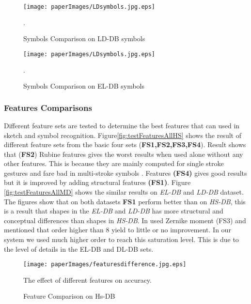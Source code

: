 \begin{figure}
	\centering
		\texttt{[image: paperImages/LDsymbols.jpg.eps]}
	\caption{Symbols Comparison on LD-DB symbols}.  %
	\label{fig:LDtest2}
\end{figure}  


\begin{figure}
	\centering
		\texttt{[image: paperImages/LDsymbols.jpg.eps]}
	\caption{Symbols Comparison on EL-DB symbols}.  %
	\label{fig:ELtest2}
\end{figure}  
 
 
\subsubsection{Features Comparisons}
\label{sec:featuresComparisions}
Different feature sets are tested to determine the best features that can used in sketch and symbol recognition. Figure\ref{fig:testFeaturesAllHS} shows the result of different feature sets from the basic four sets (\textbf{FS1,FS2,FS3,FS4}). Result shows that (\textbf{FS2}) Rubine features \cite{gestureexample12} gives the worst results when used alone without any other features. This is because they are mainly computed for single stroke gestures and fare bad in multi-stroke symbols \cite{compareFeaturSVM}. Features \textbf{(FS4)} gives good results but it is improved by adding structural features \textbf{(FS1)}.  Figure \ref{fig:testFeaturesAllMD} shows the similar results on \textsl{EL-DB} and \textsl{LD-DB} dataset. The figures show that on both datasets \textbf{FS1} perform better than on \textsl{HS-DB}, this is a result that shapes in the \textsl{EL-DB} and \textsl{LD-DB} has more structural and conceptual differences than shapes in \textsl{HS-DB}. In \cite{HeloiseBeautification} used Zernike moment (FS3) and mentioned that order higher than 8 yield to little or no improvement. In our system we used much higher order to reach this saturation level. This is due to the level of details in the EL-DB and DL-DB sets. %
 \begin{figure}
	\centering
		\texttt{[image: paperImages/featuresdifference.jpg.eps]}
	\caption{Feature Comparison on Hs-DB} The effect of different features on accuracy.  %
	\label{fig:testFeaturesAll}
\end{figure}  


